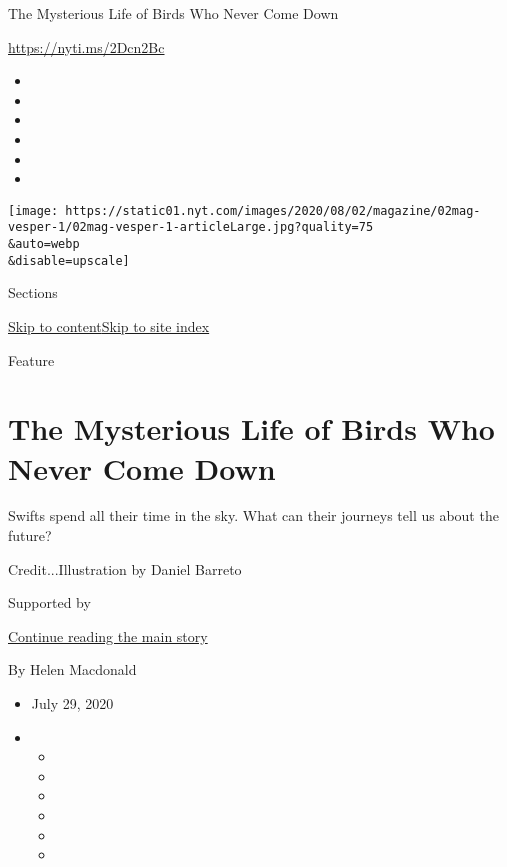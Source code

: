 The Mysterious Life of Birds Who Never Come Down

\url{https://nyti.ms/2Dcn2Bc}

\begin{itemize}
\item
\item
\item
\item
\item
\item
\end{itemize}

\texttt{[image: https://static01.nyt.com/images/2020/08/02/magazine/02mag-vesper-1/02mag-vesper-1-articleLarge.jpg?quality=75\\\&auto=webp\\\&disable=upscale]}

Sections

\protect\hyperlink{site-content}{Skip to
content}\protect\hyperlink{site-index}{Skip to site index}

Feature

\hypertarget{the-mysterious-life-of-birds-who-never-come-down}{%
\section{The Mysterious Life of Birds Who Never Come
Down}\label{the-mysterious-life-of-birds-who-never-come-down}}

Swifts spend all their time in the sky. What can their journeys tell us
about the future?

Credit...Illustration by Daniel Barreto

Supported by

\protect\hyperlink{after-sponsor}{Continue reading the main story}

By Helen Macdonald

\begin{itemize}
\item
  July 29, 2020
\item
  \begin{itemize}
  \item
  \item
  \item
  \item
  \item
  \item
  \end{itemize}
\end{itemize}

